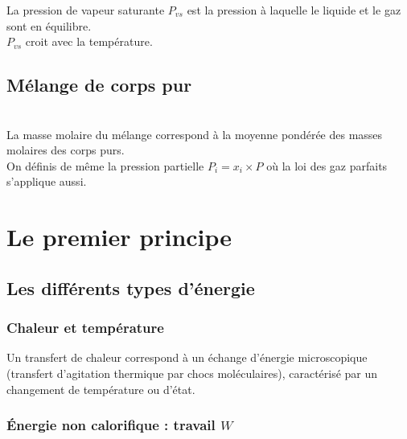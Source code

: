 \documentclass[13pt, twoside, a4paper, french]{report}
\begin{document}
            \vspace{-7pt}
            La pression de vapeur saturante $P_{vs}$ est la pression à laquelle le liquide et le gaz sont en équilibre.\\
            $P_{vs}$ croit avec la température.


    \section{Mélange de corps pur}\label{sec:melange-de-corps-pur}

        \vspace{2pt}\\
        La masse molaire du mélange correspond à la moyenne pondérée des masses molaires des corps purs.\\
        On définis de même la pression partielle $P_i = x_i \times P$ où la loi des gaz parfaits s'applique aussi.


\chapter{Le premier principe}\label{ch:le-premier-principe-de-la-thermodynamique}


    \section{Les différents types d’énergie}\label{sec:les-differents-types-denergie}

        \subsection{Chaleur et température}\label{subsec:chaleur-et-temperature}

            Un transfert de chaleur correspond à un échange d'énergie microscopique (transfert d'agitation thermique par chocs moléculaires), caractérisé par un changement de température ou d'état.

        \subsection{Énergie non calorifique : travail $W$}\label{subsec:energie-non-calorifique}

\end{document}
